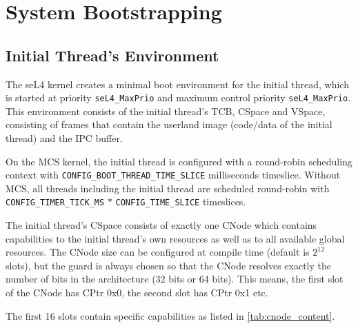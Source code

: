 %
%
%

\chapter{\label{ch:bootup}System Bootstrapping}

\section{Initial Thread's Environment}

The seL4 kernel creates a minimal boot environment for the initial thread, which
 is started at priority \texttt{seL4\_MaxPrio} and maximum control priority \texttt{seL4\_MaxPrio}.
This environment consists of the initial thread's TCB, CSpace and VSpace,
consisting of frames that contain the userland image (code/data of the initial
thread) and the IPC buffer.

On the MCS kernel, the initial thread is configured with a round-robin scheduling context
with \texttt{CONFIG\_BOOT\_THREAD\_TIME\_SLICE} milliseconds timeslice.
Without MCS, all threads including the initial thread are scheduled round-robin with
\texttt{CONFIG\_TIMER\_TICK\_MS} $*$ \texttt{CONFIG\_TIME\_SLICE} timeslices.

The initial thread's CSpace consists of exactly one CNode
which contains capabilities to the initial
thread's own resources as well as to all available global resources.
The CNode size can be configured at compile time (default is $2^{12}$
slots), but the guard is always chosen so that the CNode resolves exactly
the number of bits in the architecture (32 bits or 64 bits). This means, the
first slot of the CNode has CPtr 0x0, the second slot has CPtr 0x1 etc.

The first 16 slots contain specific capabilities as listed in
\autoref{tab:cnode_content}.

